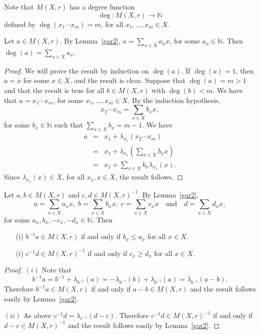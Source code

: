 Note that $M(X,r)$ has a degree function
$$\deg\colon M(X,r)\longrightarrow \mathbb{N}$$
defined by $\deg(x_1\cdots x_m)=m$, for all $x_1,\dots ,x_m\in X$.

\begin{lemma}\label{degree} Let $a\in M(X,r)$. By Lemma~\ref{gar2},
$a=\sum_{x\in X}a_xx$, for some $a_x\in \mathbb{N}$. Then
$\deg(a)=\sum_{x\in X}a_x$.
\end{lemma}

\begin{proof} We will prove the result by induction on $\deg(a)$.
If $\deg(a)=1$, then $a=x$ for some $x\in X$, and the result is
clear. Suppose that $\deg(a)=m>1$ and that the result is true for
all $b\in M(X,r)$ with $\deg(b)<m$. We have that $a=x_1\cdots x_m$,
for some $x_1,\dots ,x_m\in X$. By the induction hypothesis,
$$x_2\cdots x_m=\sum_{x\in X}b_xx,$$
for some $b_x\in \mathbb{N}$ such that $\sum_{x\in X}b_x=m-1$. We
have
\begin{eqnarray*}
a&=&x_1+\lambda_{x_1}(x_2\cdots x_m)\\
&=&x_1+\lambda_{x_1}(\sum_{x\in X}b_xx)\\
&=&x_1+\sum_{x\in X}b_x\lambda_{x_1}(x).
\end{eqnarray*}
Since $\lambda_{x_1}(x)\in X$, for all $x_1,x\in X$, the result
follows.
\end{proof}


\begin{lemma}\label{gar3} Let $a,b\in M(X,r)$ and $c,d\in M(X,r)^{-1}$. By
Lemma~\ref{gar2},
$$a=\sum_{x\in X}a_xx,\; b=\sum_{x\in X}b_xx,\; c=\sum_{x\in X}c_xx\quad\mbox{and}\quad d=\sum_{x\in X}d_xx,$$
for some $a_x,b_x,-c_x,-d_x\in \mathbb{N}$. Then
\begin{itemize}
\item[(i)] $b^{-1}a\in M(X,r)$ if and only if $b_x\leq a_x$ for all
$x\in X$.
\item[(i)] $c^{-1}d\in M(X,r)^{-1}$ if and only if $c_x\geq d_x$ for all
$x\in X$.
\end{itemize}
\end{lemma}

\begin{proof} $(i)$ Note that
$$b^{-1}a=b^{-1}+\lambda_{b^{-1}}(a)=-\lambda_{b^{-1}}(b)+\lambda_{b^{-1}}(a)=\lambda_{b^{-1}}(a-b).$$
Therefore $b^{-1}a\in M(X,r)$ if and only if $a-b\in M(X,r)$ and the
result follows easily by Lemma~\ref{gar2}.

$(ii)$ As above $c^{-1}d=\lambda_{c^{-1}}(d-c)$. Therefore
$c^{-1}d\in M(X,r)^{-1}$ if and only if $d-c\in M(X,r)^{-1}$ and the
result follows easily by Lemma~\ref{gar2}.
\end{proof}

